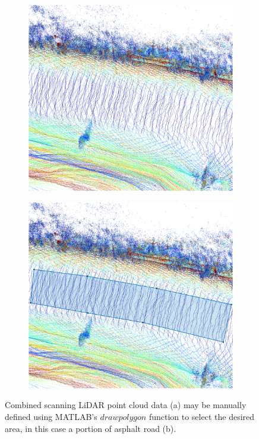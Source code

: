 \documentclass[numbered,pdftex]{ohio-etd}
\begin{document}
{{		\begin{figure}[H]
			\centering
			\begin{subfigure}{0.45\textwidth}
				\centering
				\includegraphics[width=1.0\linewidth]{Defense_Images/pre_area_select}
				\caption[Road area on Point Cloud]{}
				\label{fig:pre_select_area_in_results}
			\end{subfigure}
			\begin{subfigure}{0.45\textwidth}
				\centering
				\includegraphics[width=1.0\linewidth]{Defense_Images/post_area_select}
				\caption[Selected Road area on Point Cloud]{}
				\label{fig:area_selected_in_results}
			\end{subfigure}
			\caption[Manual Area Selection Process]{Combined scanning LiDAR point cloud data (a) may be manually defined using MATLAB's $drawpolygon$ function to select the desired area, in this case a portion of asphalt road (b). }
			\label{fig:Area_Selection_Process_in_results}
		\end{figure}
		
}}
\end{document}
